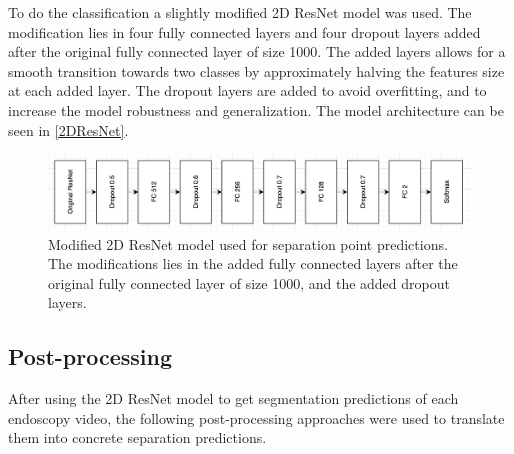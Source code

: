 To do the classification a slightly modified 2D ResNet model was used. The modification lies in four fully connected layers and four dropout layers added after the original fully connected layer of size 1000. The added layers allows for a smooth transition towards two classes by approximately halving the features size at each added layer. The dropout layers are added to avoid overfitting, and to increase the model robustness and generalization. The model architecture can be seen in \autoref{2DResNet}.
\begin{figure}[H]
	\centering
	\includegraphics[width=\linewidth]{Materials/Methods/Mod2DResNet}
	\caption{Modified 2D ResNet model used for separation point predictions. The modifications lies in the added fully connected layers after the original fully connected layer of size 1000, and the added dropout layers.}
	\label{2DResNet}
\end{figure}

\subsection{Post-processing}
After using the 2D ResNet model to get segmentation predictions of each endoscopy video, the following post-processing approaches were used to translate them into concrete separation predictions.

